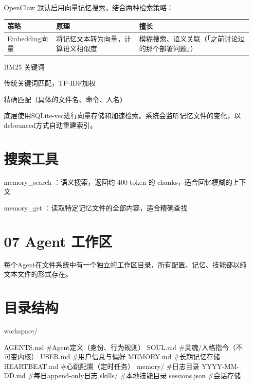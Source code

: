 \documentclass[
  10
]{article}
\newenvironment{Shaded}{}{}
\newcommand{\NormalTok}[1]{#1}
\newcounter{none} %
\begin{document}
OpenClaw 默认启用向量记忆搜索，结合两种检索策略：

{\def\LTcaptype{none} %
\begin{longtable}[]{@{}|l|l|l|@{}}
\toprule\noalign{}
\endhead
\bottomrule\noalign{}
\endlastfoot
\hline
策略 & 原理 & 擅长 \\
\hline
Embedding向量 & 将记忆文本转为向量，计算语义相似度 &
模糊搜索、语义关联（「之前讨论过的那个部署问题」） \\
\hline
\end{longtable}
}

BM25 关键词

传统关键词匹配，TF-IDF加权

精确匹配（具体的文件名、命令、人名）

底层使用SQLite-vec进行向量存储和加速检索。系统会监听记忆文件的变化，以debounced方式自动重建索引。

\section{搜索工具}\label{ux641cux7d22ux5de5ux5177}

memory\_search ：语义搜索，返回约 400 token 的
chunks，适合回忆模糊的上下文

memory\_get ：读取特定记忆文件的全部内容，适合精确查找

\section{07 Agent 工作区}\label{agent-ux5de5ux4f5cux533a}

每个Agent在文件系统中有一个独立的工作区目录，所有配置、记忆、技能都以纯文本文件的形式存在。

\section{目录结构}\label{ux76eeux5f55ux7ed3ux6784}

workspace/

\begin{Shaded}
\begin{Highlighting}[]
\NormalTok{AGENTS.md \#Agent定义（身份、行为规则）  }
\NormalTok{SOUL.md \#灵魂/人格指令（不可变内核）  }
\NormalTok{USER.md \#用户信息与偏好  }
\NormalTok{MEMORY.md \#长期记忆存储  }
\NormalTok{HEARTBEAT.md \#心跳配置（定时任务）  }
\NormalTok{memory/ \#日志目录  }
\NormalTok{YYYY{-}MM{-}DD.md \#每日append{-}only日志  }
\NormalTok{skills/ \#本地技能目录  }
\NormalTok{sessions.json \#会话存储}
\end{Highlighting}
\end{Shaded}
\end{document}

